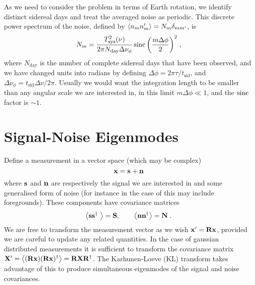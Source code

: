 \documentclass[prd,twocolumn,nofootinbib]{revtex4}
\begin{document}
As we need to consider the problem in terms of Earth rotation, we identify
distinct sidereal days and treat the averaged noise as periodic. This discrete
power spectrum of the noise, defined by $\left\langle n_m n_m' \right\rangle = N_m \delta_{m m'}$,
is
\begin{equation}
N_m = \frac{T_\text{sys}^2(\nu)}{2 \pi N_\text{day} \Delta\nu_\phi} \operatorname{sinc}{\left(\frac{m
      \Delta\phi}{2}\right)}^2 \; ,
\end{equation}
where $N_\text{day}$ is the number of complete sidereal days that have been
observed, and we have changed units into radians by defining $\Delta\phi = 2\pi
\tau / t_\text{sid}$, and $\Delta\nu_\phi = t_\text{sid} \Delta\nu / 2\pi$.
Usually we would want the integration length to be smaller than any angular
scale we are interested in, in this limit $m \Delta\phi \ll 1$, and the $\operatorname{sinc}$
factor is $\sim 1$.

\section{Signal-Noise Eigenmodes}



\noindent
Define a measurement in a vector space (which may be complex)
\begin{equation}
\mathbf{x} = \mathbf{s} + \mathbf{n}
\end{equation}
where $\mathbf{s}$ and $\mathbf{n}$ are respectively the signal we are interested in and some
generalised form of noise (for instance in the case of \tcm this may include
foregrounds). These components have covariance matrices
\begin{equation}
\left\langle \mathbf{s} \mathbf{s}^{\dagger}\ \right\rangle = \mathbf{S}, \qquad \left\langle \mathbf{n} \mathbf{n}^{\dagger} \right\rangle = \mathbf{N} \; .
\end{equation}
We are free to transform the measurement vector as we wish $\mathbf{x}' = \mathbf{R}\mathbf{x}$,
provided we are careful to update any related quantities. In the case of
gaussian distributed measurements it is sufficient to transform the covariance
matrix $\mathbf{X}' = \left\langle (\mathbf{R} \mathbf{x}) (\mathbf{R} \mathbf{x})^{\dagger} \right\rangle = \mathbf{R}
\mathbf{X}\mathbf{R}^{\dagger}$. The Karhunen-Loeve (KL) transform takes advantage of this to
produce simultaneous eigenmodes of the signal and noise covariances.
\end{document}
